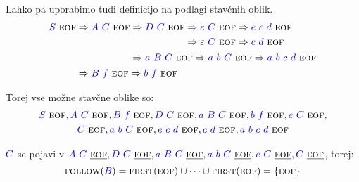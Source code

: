 \documentclass{article}
\newcommand{\FIRST}{\textsc{first}}
\newcommand{\FOLLOW}{\textsc{follow}}
\newcommand{\EOF}{\textsc{eof}}
\newcommand{\Symbol}[1]{\textcolor{blue}{#1}}
\newcommand{\Null}{\varepsilon}
\newcommand{\Derive}{\Rightarrow}
\newcommand{\Seq}{\ }
\begin{document}
Lahko pa uporabimo tudi definicijo na podlagi stavčnih oblik.
\begin{equation*}
  \Symbol{S} \Seq \EOF \begin{aligned}[t]
    &\Derive \Symbol{A} \Seq \Symbol{C} \Seq \EOF \begin{aligned}[t]
      &\Derive \Symbol{D} \Seq \Symbol{C} \Seq \EOF \begin{aligned}[t]
        &\Derive \Symbol{e} \Seq \Symbol{C} \Seq \EOF \Derive \Symbol{e} \Seq \Symbol{c} \Seq \Symbol{d} \Seq \EOF \\
        &\Derive \Null \Seq \Symbol{C} \Seq \EOF \Derive \Symbol{c} \Seq \Symbol{d} \Seq \EOF \\
      \end{aligned}\\
      &\Derive \Symbol{a} \Seq \Symbol{B} \Seq \Symbol{C} \Seq \EOF \Derive \Symbol{a} \Seq \Symbol{b} \Seq \Symbol{C} \Seq \EOF \Derive \Symbol{a} \Seq \Symbol{b} \Seq \Symbol{c} \Seq \Symbol{d} \Seq \EOF
    \end{aligned}\\
    &\Derive \Symbol{B} \Seq \Symbol{f} \Seq \EOF \Derive \Symbol{b} \Seq \Symbol{f} \Seq \EOF
  \end{aligned}
\end{equation*}

Torej vse možne stavčne oblike so:
\begin{multline*}
  \Symbol{S} \Seq \EOF, \Symbol{A} \Seq \Symbol{C} \Seq \EOF, \Symbol{B} \Seq \Symbol{f} \Seq \EOF, \Symbol{D} \Seq \Symbol{C} \Seq \EOF, \Symbol{a} \Seq \Symbol{B} \Seq \Symbol{C} \Seq \EOF, \Symbol{b} \Seq \Symbol{f} \Seq \EOF, \Symbol{e} \Seq \Symbol{C} \Seq \EOF,\\ \Symbol{C} \Seq \EOF, \Symbol{a} \Seq \Symbol{b} \Seq \Symbol{C} \Seq \EOF, \Symbol{e} \Seq \Symbol{c} \Seq \Symbol{d} \Seq \EOF, \Symbol{c} \Seq \Symbol{d} \Seq \EOF, \Symbol{a} \Seq \Symbol{b} \Seq \Symbol{c} \Seq \Symbol{d} \Seq \EOF
\end{multline*}

$\Symbol{C}$ se pojavi v $\Symbol{A} \Seq \Symbol{C} \Seq \underline{\EOF}, \Symbol{D} \Seq \Symbol{C} \Seq \underline{\EOF}, \Symbol{a} \Seq \Symbol{B} \Seq \Symbol{C} \Seq \underline{\EOF}, \Symbol{a} \Seq \Symbol{b} \Seq \Symbol{C} \Seq \underline{\EOF}, \Symbol{e} \Seq \Symbol{C} \Seq \underline{\EOF}, \Symbol{C} \Seq \underline{\EOF}$, torej:
\begin{equation*}
  \FOLLOW(\Symbol{B}) = \FIRST(\EOF) \cup \dots \cup \FIRST(\EOF) = \{\EOF\}
\end{equation*}
\end{document}
